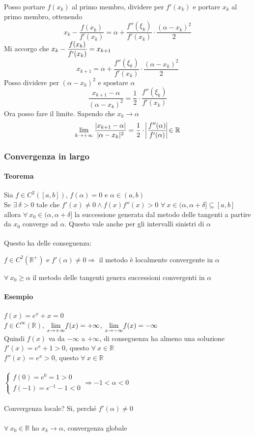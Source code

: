 \documentclass[10pt]{book}
\begin{document}
Posso portare $f(x_k)$ al primo membro, dividere per $f'(x_k)$ e portare $x_k$ al primo membro, ottenendo
$$x_k - \frac{f(x_k)}{f'(x_k)} = \alpha + \frac{f''(\xi_k)}{f'(x_k)}\cdot\frac{(\alpha - x_k)^2}{2}$$
Mi accorgo che $\mathlarger{x_k - \frac{f(x_k)}{f'(x_k)} = x_{k+1}}$
$$x_{k+1} = \alpha + \frac{f''(\xi_k)}{f'(x_k)}\cdot\frac{(\alpha - x_k)^2}{2}$$
Posso dividere per $(\alpha - x_k)^2$ e spostare $\alpha$
$$\frac{x_{k+1} - \alpha}{(\alpha - x_k)^2} = \frac{1}{2}\cdot\frac{f''(\xi_k)}{f'(x_k)}$$
Ora posso fare il limite. Sapendo che $x_k \rightarrow \alpha$
$$\lim_{k\to+\infty}\frac{|x_{k+1} - \alpha|}{|\alpha - x_k|^2} = \frac{1}{2}\cdot\:\vline\frac{f''(\alpha)}{f'(\alpha)}\vline \in \mathbb{R}$$
\subsubsection{Convergenza in largo}
\paragraph{Teorema} Sia $f\in C^2([a, b])$, $f(\alpha) = 0$ e $\alpha \in (a, b)$\\
Se $\exists\:\delta > 0$ tale che $f'(x) \neq 0 \wedge f(x)f''(x) > 0$ $\forall\:x \in(\alpha, \alpha + \delta]\subseteq[a, b]$ allora $\forall\:x_0\in(\alpha, \alpha + \delta]$ la successione generata dal metodo delle tangenti a partire da $x_0$ converge ad $\alpha$. Questo vale anche per gli intervalli sinistri di $\alpha$\\\\
Questo ha delle conseguenza:
\begin{list}{}{}
	\item $f\in C^2(\mathbb{R}^+)$ e $f'(\alpha) \neq 0 \Rightarrow$ il metodo è localmente convergente in $\alpha$
	\item $\forall\:x_0 \geq \alpha$ il metodo delle tangenti genera successioni convergenti in $\alpha$
\end{list}
\pagebreak
\paragraph{Esempio} $f(x) = e^x + x = 0$\\
$f\in C^\infty(\mathbb{R})$, $\mathlarger{\lim_{x\to+\infty}} f(x) = +\infty$, $\mathlarger{\lim_{x\to-\infty}} f(x) = -\infty$\\
Quindi $f(x)$ va da $-\infty$ a $+\infty$, di conseguenza ha almeno una soluzione\\
$f'(x) = e^x + 1 > 0$, questo $\forall\:x \in\mathbb{R}$\\
$f''(x) = e^x > 0$, questo $\forall\:x \in\mathbb{R}$\\\\
$\left\{\begin{array}{l}
f(0) = e^0 = 1 > 0\\f(-1) = e^{-1} - 1 < 0
\end{array}\right.\Rightarrow -1 < \alpha < 0$\\\\
Convergenza locale? Si, perché $f'(\alpha) \neq 0$\\\\
$\forall\:x_0\in\mathbb{R}$ ho $x_k \rightarrow \alpha$, convergenza globale
\end{document}
